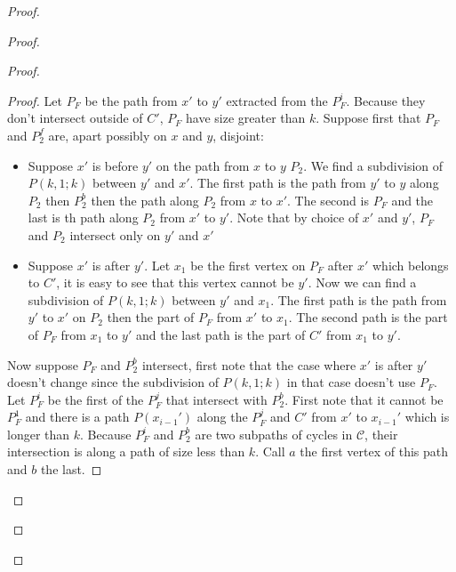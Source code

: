 \documentclass[utf8,10pt]{article}
\theoremstyle{plain}
\theoremstyle{definition}
\theoremstyle{remark}
\begin{document}
\begin{proof}
\begin{proof}
\begin{proof}
\begin{proof}
Let $P_F$ be the path from $x'$ to $y'$ extracted from the $P_F^i$. Because they don't intersect outside of $C'$,
$P_F$ have size greater than $k$.
Suppose first that $P_F$ and $P_2^f$ are, apart possibly on $x$ and $y$, disjoint:


\begin{itemize}
	\item Suppose $x'$ is before $y'$ on the path from $x$ to $y$ $P_2$. We find a subdivision of $P(k,1;k)$ between $y'$ and $x'$.
	The first path is the path from $y'$ to $y$ along $P_2$ then $P_2^b$ then the path along $P_2$ from $x$ to $x'$. The second
	is $P_F$ and the last is th path along $P_2$ from $x'$ to $y'$. Note that by choice of $x'$ and $y'$, $P_F$ and $P_2$ intersect
	only on $y'$ and $x'$
	\item Suppose $x'$ is after $y'$. Let $x_1$ be the first vertex on $P_F$ after $x'$ which belongs to $C'$, it is easy to see that
	this vertex cannot be $y'$. Now we can find a subdivision of $P(k,1;k)$ between $y'$ and $x_1$. The first path is the path from $y'$
	to $x'$ on $P_2$ then the part of $P_F$ from $x'$ to $x_1$. The second path is the part of $P_F$ from $x_1$ to $y'$ and the last path is
	the part of $C'$ from $x_1$ to $y'$.
\end{itemize}

Now suppose $P_F$ and $P_2^b$ intersect, first note that the case where $x'$ is after $y'$ doesn't change since the subdivision
of $P(k,1;k)$ in that case doesn't use $P_F$.
Let $P_F^i$ be the first of the $P_F^j$ that intersect with $P_2^b$. First note that it cannot be $P_F^1$ and there is a path $P(x_{i-1}')$
along the $P_F^j$ and $C'$ from $x'$ to $x_{i-1}'$ which is longer than $k$.
Because $P_F^i$ and $P_2^b$ are two subpaths of cycles in $\mathcal{C}$, their intersection is along a path of size less than $k$.
Call $a$ the first vertex of this path and $b$ the last.


\end{proof}
\end{proof}
\end{proof}
\end{proof}
\end{document}

